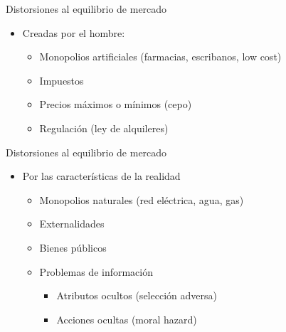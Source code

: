 \documentclass{beamer}
\begin{document}
\begin{frame}{Distorsiones al equilibrio de mercado}
    \begin{itemize}
        \item Creadas por el hombre:
        \begin{itemize}
            \item Monopolios artificiales (farmacias, escribanos, low cost)
             \vspace{1mm}
            \item Impuestos
             \vspace{1mm}
            \item Precios máximos o mínimos (cepo)
             \vspace{1mm}
            \item Regulación (ley de alquileres)
        \end{itemize}
    \end{itemize}
\end{frame}

\begin{frame}{Distorsiones al equilibrio de mercado}
    \begin{itemize}
        \item Por las características de la realidad \vspace{1mm}
        \begin{itemize}
            \item Monopolios naturales (red eléctrica, agua, gas)   
             \vspace{1mm}
            \item Externalidades
             \vspace{1mm}
            \item Bienes públicos
            \vspace{1mm}
            \item Problemas de información
            \begin{itemize}
                \item Atributos ocultos (selección adversa)
                 \vspace{1mm}
                \item Acciones ocultas (moral hazard)
            \end{itemize}        
        \end{itemize}
    \end{itemize}
\end{frame}

\end{document}
